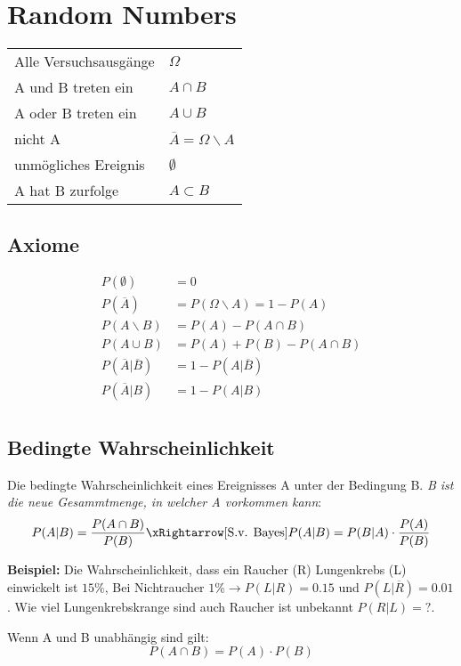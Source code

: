 \section{Random Numbers}
\begin{table}[H]
	\centering
	\begin{tabular}{l|l}
		Alle Versuchsausgänge & $\Omega$ \\
		A und B treten ein & $A \cap B$ \\
		A oder B treten ein & $A \cup B$ \\
		nicht A & $\overline{A} = \Omega \backslash A$ \\
		unmögliches Ereignis & $\emptyset$ \\
		A hat B zurfolge & $A \subset B$ \\
	\end{tabular}
\end{table}

\subsection{Axiome}
\begin{align*}
	P(\emptyset) &= 0 \\
	P(\overline{A}) &= P(\Omega \backslash A) = 1 - P(A) \\
	P(A \backslash B) &= P(A) - P(A \cap B) \\
	P(A \cup B) &= P(A)  + P(B) - P(A \cap B) \\
	P(\overline{A} | \overline{B}) &= 1-P(A|\overline{B}) \\
	P(\overline{A} | B) &= 1-P(A|B) \\
\end{align*}

\subsection{Bedingte Wahrscheinlichkeit}
Die bedingte Wahrscheinlichkeit eines Ereignisses A unter der Bedingung B. \textit{B ist die neue Gesammtmenge, in welcher A vorkommen kann}:
\[
P(A|B) = \frac{P(A \cap B)}{P(B)} \xRightarrow[\text{S.v. Bayes}]{} P(A|B) = P(B|A)\cdot\frac{P(A)}{P(B)}
\]

\noindent\textbf{Beispiel:} Die Wahrscheinlichkeit, dass ein Raucher (R) Lungenkrebs (L) einwickelt ist $15\%$, Bei Nichtraucher $1\% \rightarrow P(L|R) = 0.15$ und $P(L|\overline{R}) = 0.01$. Wie viel Lungenkrebskrange sind auch Raucher ist unbekannt $P(R|L) = ?$.

\noindent Wenn A und B unabhängig sind gilt:
\[ P(A \cap B) = P(A) \cdot P(B)\]


